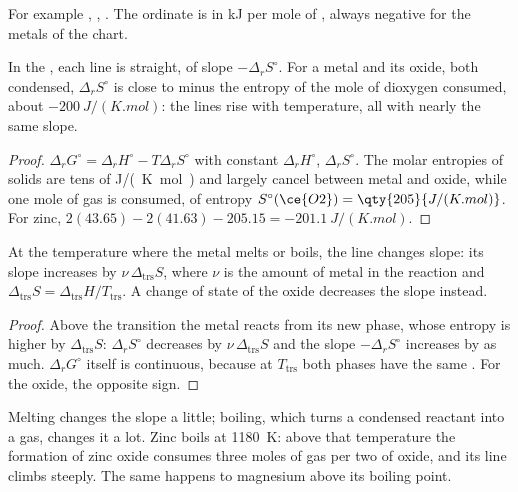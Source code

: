For example , , . The ordinate is in \unit{kJ} per mole of , always negative for the
metals of the chart.

\begin{proposition}\label{prop:b2:ellingham:line}
In the , each line is straight, of slope $-\Delta_r
S^\circ$. For a metal and its oxide, both condensed, $\Delta_r S^\circ$ is
close to minus the entropy of the mole of dioxygen consumed, about
$-\qty{200}{J/(K.mol)}$: the lines rise with temperature, all with nearly the
same slope.
\end{proposition}

\begin{proof}
$\Delta_r G^\circ = \Delta_r H^\circ - T\Delta_r S^\circ$ with constant $\Delta_r
H^\circ$, $\Delta_r S^\circ$. The molar entropies of solids are tens of
\unit{J/(K.mol)} and largely cancel between metal and oxide, while one mole of
gas is consumed, of entropy $S^\circ(\ce{O2}) = \qty{205}{J/(K.mol)}$. For zinc,
$2(43.65) - 2(41.63) - 205.15 = \qty{-201.1}{J/(K.mol)}$.
\end{proof}

\begin{proposition}\label{prop:b2:ellingham:break}
At the temperature where the metal melts or boils, the line changes slope:
its slope increases by $\nu\,\Delta_{\text{trs}}S$, where $\nu$ is the amount of
metal in the reaction and $\Delta_{\text{trs}}S = \Delta_{\text{trs}}H/T_{\text{trs}}$.
A change of state of the oxide decreases the slope instead.
\end{proposition}

\begin{proof}
Above the transition the metal reacts from its new phase, whose entropy is
higher by $\Delta_{\text{trs}}S$: $\Delta_r S^\circ$ decreases by $\nu\,\Delta_{\text{trs}}S$
and the slope $-\Delta_r S^\circ$ increases by as much. $\Delta_r G^\circ$
itself is continuous, because at $T_{\text{trs}}$ both phases have the same
. For the oxide, the opposite sign.
\end{proof}

Melting changes the slope a little; boiling, which turns a condensed reactant
into a gas, changes it a lot. Zinc boils at \qty{1180}{K}: above that
temperature the formation of zinc oxide consumes three moles of gas per two of
oxide, and its line climbs steeply. The same happens to magnesium above its
boiling point.

